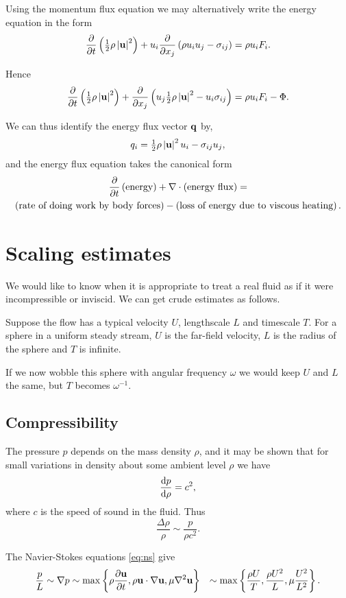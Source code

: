 \documentclass{notes}
\theoremstyle{plain}
\begin{document}
Using the momentum flux equation we may alternatively write the energy
equation in the form
\[
\frac{\partial }{\partial t} \left( \tfrac{1}{2} \rho \left|\mathbf{u}\right|^2 \right) + u_i \frac{\partial }{\partial x_j} \left(
\rho u_i u_j - \sigma_{i j} \right) = \rho u_i F_i.
\]

Hence
\[
\frac{\partial }{\partial t} \left( \tfrac{1}{2} \rho \left|\mathbf{u}\right|^2 \right) + \frac{\partial }{\partial x_j} \left(
u_j \tfrac{1}{2} \rho \left|\mathbf{u}\right|^2 - u_i \sigma_{i j} \right) = \rho u_i F_i
- \Phi.
\]

We can thus identify the energy flux vector $\mathbf{q}$ by,
\[
q_i = \tfrac{1}{2} \rho \left|\mathbf{u}\right|^2 u_i  - \sigma_{i j} u_j,
\]
and the energy flux equation takes the canonical form
\begin{multline*}
\frac{\partial }{\partial t} \left(\text{energy}\right) + \nabla \cdot \left(\text{energy flux} \right)
=\\ \left( \text{rate of doing work by body forces} \right) -
\left( \text{loss of energy due to viscous heating} \right).
\end{multline*}

\section{Scaling estimates}

We would like to know when it is appropriate to treat a real fluid as if
it were incompressible or inviscid.  We can get crude estimates as follows.

Suppose the flow has a typical velocity $U$, lengthscale $L$ and timescale
$T$.  For a sphere in a uniform steady stream, $U$ is the far-field velocity,
$L$ is the radius of the sphere and $T$ is infinite.

If we now wobble this sphere with angular frequency $\omega$ we would keep
$U$ and $L$ the same, but $T$ becomes $\omega^{-1}$.

\subsection{Compressibility}

The pressure $p$ depends on the mass density $\rho$, and it may be shown that
for small variations in density about some ambient level $\rho$ we have
\[
\frac{\mathrm{d} p}{\mathrm{d}\rho} = c^2,
\] 
where $c$ is the speed of sound in the fluid.  Thus
\[
\frac{\Delta \rho}{\rho} \sim \frac{p}{\rho c^2}.
\]

The Navier-Stokes equations \eqref{eq:ns} give
\begin{align*}
\frac{p}{L} \sim \nabla p &\sim \max \left\{ \rho \frac{\partial \mathbf{u}}{\partial t},
\rho \mathbf{u} \cdot \nabla \mathbf{u}, \mu \nabla^2 \mathbf{u}  \right\}
& \sim \max \left\{\frac{\rho U}{T}, \frac{\rho U^2}{L}, \mu \frac{U^2}{L^2}
\right\}.
\end{align*}
\end{document}
